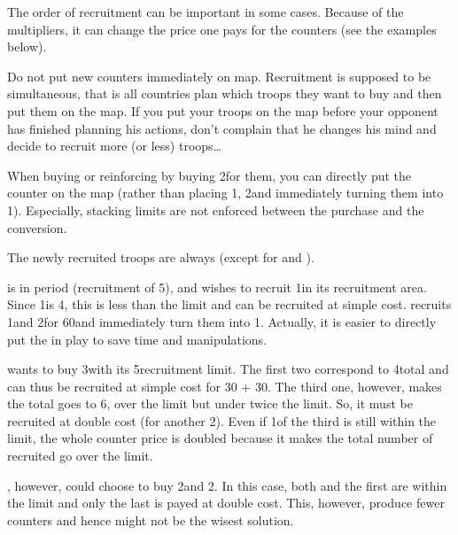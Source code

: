 \begin{playtip}
  The order of recruitment can be important in some cases. Because of the
  multipliers, it can change the price one pays for the counters (see the
  examples below).

  Do not put new counters immediately on map. Recruitment is supposed to be
  simultaneous, that is all countries plan which troops they want to buy and
  then put them on the map. If you put your troops on the map before your
  opponent has finished planning his actions, don't complain that he changes
  his mind and decide to recruit more (or less) troops\ldots

  When buying \ARMY\Faceplus or reinforcing \ARMY\Facemoins by buying 2\LD for
  them, you can directly put the \ARMY\Faceplus counter on the map (rather
  than placing 1\ARMY\Facemoins, 2\LD and immediately turning them into
  1\ARMY\Faceplus). Especially, stacking limits are not enforced between the
  purchase and the conversion.
\end{playtip}

\aparag[Moral.] The newly recruited troops are always 
(except for \SUE and \PRU).


\begin{exemple}
  \HIS is \TARQ in period  (recruitment of 5\LD), and wishes to
  recruit 1\ARMY\Faceplus in its recruitment area. Since 1\ARMY\Faceplus is
  4\LD, this is less than the limit and can be recruited at simple cost. \HIS
  recruits 1\ARMY\Facemoins and 2\LD for 60\ducats and immediately turn them
  into 1\ARMY\Faceplus. Actually, it is easier to directly put the
  \ARMY\Faceplus in play to save time and manipulations.
\end{exemple}

\begin{exemple}
  \HIS wants to buy 3\ARMY\facemoins with its 5\LD recruitment limit.  The
  first two correspond to 4\LD total and can thus be recruited at simple cost
  for 30 + 30\ducats. The third one, however, makes the total goes to 6\LD,
  over the limit but under twice the limit. So, it must be recruited at double
  cost (for another 2\ducats). Even if 1\LD of the third
  \ARMY\facemoins is still within the limit, the whole counter price is
  doubled because it makes the total number of \LD recruited go over the
  limit.

  \HIS, however, could choose to buy 2\ARMY\facemoins and 2\LD. In this case,
  both \ARMY\facemoins and the first \LD are within the limit and only the
  last \LD is payed at double cost. This, however, produce fewer \ARMY
  counters and hence might not be the wisest solution.
\end{exemple}

